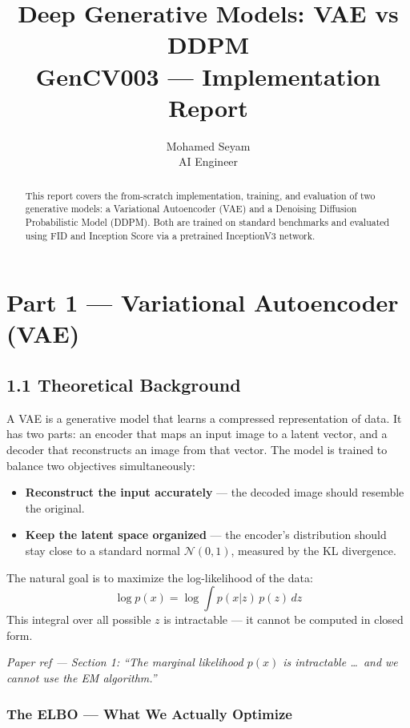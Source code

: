\documentclass{article}
\title{\textbf{Deep Generative Models: VAE vs DDPM}\\[0.5em]
\large GenCV003 --- Implementation Report}
\author{Mohamed Seyam \\ \small AI Engineer}
\date{}
\newcommand{\paperref}[1]{{\color{paperrefcolor}\emph{#1}}}
\begin{document}
\maketitle

\begin{abstract}
This report covers the from-scratch implementation, training, and evaluation of two generative models: a Variational Autoencoder (VAE) and a Denoising Diffusion Probabilistic Model (DDPM). Both are trained on standard benchmarks and evaluated using FID and Inception Score via a pretrained InceptionV3 network.
\end{abstract}

\newpage
\section{Part 1 --- Variational Autoencoder (VAE)}

\subsection{1.1 \; Theoretical Background}

A VAE is a generative model that learns a compressed representation of data. It has two parts: an encoder that maps an input image to a latent vector, and a decoder that reconstructs an image from that vector. The model is trained to balance two objectives simultaneously:

\begin{itemize}
    \item \textbf{Reconstruct the input accurately} --- the decoded image should resemble the original.
    \item \textbf{Keep the latent space organized} --- the encoder's distribution should stay close to a standard normal $\mathcal{N}(0,1)$, measured by the KL divergence.
\end{itemize}

The natural goal is to maximize the log-likelihood of the data:
\[
\log p(x) = \log \int p(x|z)\, p(z)\, dz
\]
This integral over all possible $z$ is intractable --- it cannot be computed in closed form.

\paperref{Paper ref --- Section 1: ``The marginal likelihood $p(x)$ is intractable \ldots\ and we cannot use the EM algorithm.''}

\subsubsection*{The ELBO --- What We Actually Optimize}
\end{document}
